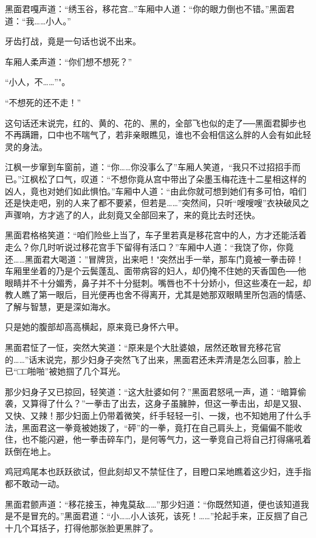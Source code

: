 \documentclass[12pt,oneside]{book}
\begin{document}
黑面君嘎声道：``绣玉谷，移花宫\ldots{}''车厢中人道：``你的眼力倒也不错。''黑面君道：``我\ldots\ldots 小人。''

牙齿打战，竟是一句话也说不出来。

车厢人柔声道：``你们想不想死？''

``小人，不\ldots\ldots{}''"。

``不想死的还不走！''

这句话还末说完，红的、黄的、花的、黑的，全部飞也似的走了──黑面君脚步也不再蹒跚，口中也不喘气了，若非亲眼瞧见，谁也不会相信这么胖的人会有如此轻灵的身法。

江枫一步窜到车窗前，道：``你\ldots\ldots 你没事么了''车厢人笑道，``我只不过招招手而已。''江枫松了口气，叹道：``不想你竟从宫中带出了朵墨玉梅花连十二星相这样的凶人，竟也对她们如此惧怕。''车厢中人道：``由此你就可想到她们有多可怕，咱们还是快走吧，别的人来了都不要紧，但若是\ldots\ldots{}''突然间，只听``嗖嗖嗖''衣袂破风之声骤响，方才逃了的人，此刻竟又全部回来了，来的竟比去时还快。

黑面君格格笑道：``咱们险些上当了，车子里若真是移花宫中的人，方才还能活着走么？你几时听说过移花宫手下留得有活口？''车厢中人道：``我饶了你，你竟还\ldots\ldots 黑面君大喝道：''冒牌货，出来吧！"突然出手一举，那车门竟被一拳击碎！车厢里坐着的乃是个云鬓蓬乱、面带病容的妇人，却仍掩不住她的天香国色──他眼睛并不十分媚秀，鼻子并不十分挺刺。嘴唇也不十分娇小，但这些凑在一起，却教人瞧了第一眼后，目光便再也舍不得离开，尤其是她那双眼睛里所包涵的情感、了解与智慧，更是深如海水。

只是她的腹部却高高横起，原来竟已身怀六甲。

黑面君怔了一怔，突然大笑道：``原来是个大肚婆娘，居然还敢冒充移花官的\ldots\ldots{}''话末说完，那少妇身子突然飞了出来，黑面君还未弄清是怎么回事，脸上已``□□啪啪''被她掴了几个耳光。

那少妇身子又已掠回，轻笑道：``这大肚婆如何？''黑面君怒吼一声，道：``暗算偷袭，又算得了什么？''一拳击了出去，这身子虽臃肿，但这一拳击出，却是又狠、又快、又辣！那少妇面上仍带着微笑，纤手轻轻一引、一拨，也不知她用了什么手法，黑面君这一拳竟被她拨了，``砰''的一拳，竟打在自己肩头上，竞偏偏不能收住，也不能闪避，他一拳击碎车门，是何等气力，这一拳竞自己将自己打得痛吼着跃倒在地上。

鸡冠鸡尾本也跃跃欲试，但此刻却又不禁怔住了，目瞪口呆地瞧着这少妇，连手指都不敢动一动。

黑面君颤声道：``移花接玉，神鬼莫敌\ldots\ldots{}''那少妇道：``你既然知道，便也该知道我是不是冒充的。''黑面君道：``小\ldots\ldots 小人该死，该死！\ldots\ldots{}''抡起手来，正反掴了自己十几个耳括子，打得他那张脸更黑胖了。
\end{document}

